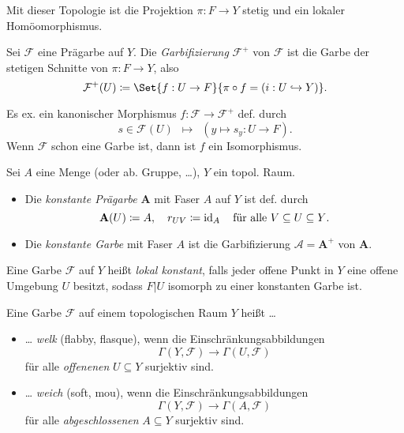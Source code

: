 \documentclass{cheat-sheet}
\newcommand{\Fais}{\mathcal{F}} %
\begin{document}
\begin{bem}
  Mit dieser Topologie ist die Projektion $\pi : F \to Y$ stetig und ein lokaler Homöomorphismus.
\end{bem}

\begin{defn}
  Sei $\Fais$ eine Prägarbe auf $Y$. Die \emph{Garbifizierung} $\Fais^+$ von $\Fais$ ist die Garbe der stetigen Schnitte von $\pi : F \to Y$, also
  \[ \Fais^+(U) \coloneqq \Set{f : U \to F}{\pi \circ f = (i : U \hookrightarrow Y)}. \]
\end{defn}

\begin{prop}
  Es ex. ein kanonischer Morphismus $f : \Fais \to \Fais^+$ def. durch
  \[ s \in \Fais(U) \enspace \mapsto \enspace (y \mapsto s_y : U \to F). \]
  Wenn $\Fais$ schon eine Garbe ist, dann ist $f$ ein Isomorphismus.
\end{prop}


\begin{defn}
  Sei $A$ eine Menge (oder ab. Gruppe, \ldots), $Y$ ein topol. Raum.
  \begin{itemize}
    \item Die \emph{konstante Prägarbe} $\mathbf{A}$ mit Faser $A$ auf $Y$ ist def. durch
    \[
      \mathbf{A}(U) \coloneqq A, \quad
      r_{UV} \coloneqq \operatorname{id}_A \quad
      \text{für alle $V \subseteq U \subseteq Y$.}
    \]
    \item Die \emph{konstante Garbe} mit Faser $A$ ist die Garbifizierung $\mathcal{A} = \mathbf{A}^+$ von $\mathbf{A}$.
  \end{itemize}
\end{defn}

\begin{defn}
  Eine Garbe $\Fais$ auf $Y$ heißt \emph{lokal konstant}, falls jeder offene Punkt in $Y$ eine offene Umgebung $U$ besitzt, sodass $F|U$ isomorph zu einer konstanten Garbe ist.
\end{defn}

\begin{defn}
   Eine Garbe $\Fais$ auf einem topologischen Raum $Y$ heißt \ldots{}
  \begin{itemize}
    \item \ldots{} \emph{welk} (flabby, flasque), wenn die Einschränkungsabbildungen
    \[ \Gamma(Y, \Fais) \to \Gamma(U, \Fais) \]
    für alle {\em offenenen} $U \subseteq Y$ surjektiv sind.
    \item \ldots{} \emph{weich} (soft, mou), wenn die Einschränkungsabbildungen
    \[ \Gamma(Y, \Fais) \to \Gamma(A, \Fais) \]
    für alle {\em abgeschlossenen} $A \subseteq Y$ surjektiv sind.
  \end{itemize}
\end{defn}
\end{document}
